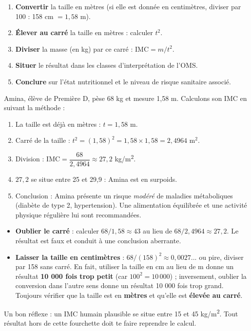 \documentclass[11pt]{article}
\newcommand{\cle}[1]{{\popxbold\color{popdark}#1}}
\begin{document}
\begin{methode}
\begin{enumerate}
\item \textbf{Convertir} la taille en mètres (si elle est donnée en centimètres, diviser par 100 : 158 cm $= 1{,}58$ m).
\item \textbf{Élever au carré} la taille en mètres : calculer $t^2$.
\item \textbf{Diviser} la masse (en kg) par ce carré : $\text{IMC} = m/t^2$.
\item \textbf{Situer} le résultat dans les classes d'interprétation de l'OMS.
\item \textbf{Conclure} sur l'état nutritionnel et le niveau de risque sanitaire associé.
\end{enumerate}
\end{methode}

\begin{exemplebox}
Amina, élève de Première D, pèse 68 kg et mesure 1,58 m. Calculons son IMC en suivant la méthode :
\begin{enumerate}
\item La taille est déjà en mètres : $t = 1{,}58$ m.
\item Carré de la taille : $t^2 = (1{,}58)^2 = 1{,}58 \times 1{,}58 = 2{,}4964$ m$^2$.
\item Division : $\text{IMC} = \dfrac{68}{2{,}4964} \approx 27{,}2$ \si{kg/m^2}.
\item $27{,}2$ se situe entre 25 et 29,9 : Amina est en \cle{surpoids}.
\item Conclusion : Amina présente un risque \emph{modéré} de maladies métaboliques (diabète de type 2, hypertension). Une alimentation équilibrée et une activité physique régulière lui sont recommandées.
\end{enumerate}
\end{exemplebox}

\begin{attention}
\begin{itemize}
\item \textbf{Oublier le carré} : calculer $68 / 1{,}58 \approx 43$ au lieu de $68 / 2{,}4964 \approx 27{,}2$. Le résultat est faux et conduit à une conclusion aberrante.
\item \textbf{Laisser la taille en centimètres} : $68 / (158)^2 \approx 0{,}0027$... ou pire, diviser par 158 sans carré. En fait, utiliser la taille en cm au lieu de m donne un résultat \textbf{10 000 fois trop petit} (car $100^2 = 10\,000$) ; inversement, oublier la conversion dans l'autre sens donne un résultat 10 000 fois trop grand. Toujours vérifier que la taille est en \textbf{mètres} et qu'elle est \textbf{élevée au carré}.
\end{itemize}
Un bon réflexe : un IMC humain plausible se situe entre 15 et 45 \si{kg/m^2}. Tout résultat hors de cette fourchette doit te faire reprendre le calcul.
\end{attention}
\end{document}
